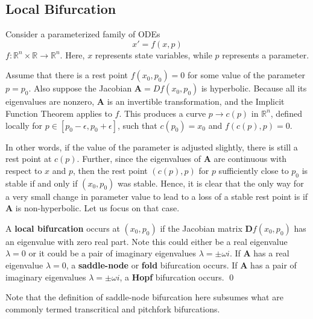 \subsection{Local Bifurcation}

Consider a parameterized family of ODEs
%
\begin{equation}
	x' = f(x, p)
\end{equation}
%
$f: \mathbb{R}^n \times \mathbb{R} \to \mathbb{R}^n$. Here, $x$ represents state variables, while $p$ represents a parameter. 

Assume that there is a rest point $f(x_0,p_0) = 0$ for some value of the parameter $p = p_0$. Also suppose the Jacobian $\mathbf{A} = Df(x_0, p_0)$ is hyperbolic.
%
%
Because all its eigenvalues are nonzero, $\mathbf{A}$ is an invertible transformation, and the Implicit Function Theorem applies to $f$. This produces a curve $p \to c(p)$ in $\mathbb{R}^n$, defined locally for $p \in [p_0-\epsilon, p_0 + \epsilon]$, such that $c(p_0) = x_0$ and $f(c(p), p) = 0$. 

In other words, if the value of the parameter is adjusted slightly, there is still a rest point at $c(p)$. Further, since the eigenvalues of $\textbf{A}$ are continuous with respect to $x$ and $p$, then the rest point $(c(p), p)$ for $p$ sufficiently close to $p_0$ is stable if and only if $(x_0,p_0)$ was stable. Hence, it is clear that the only way for a very small change in parameter value to lead to a loss of a stable rest point is if $\mathbf{A}$ is non-hyperbolic. Let us focus on that case.

\begin{definition}
	A \textbf{local bifurcation} occurs at ${\displaystyle (x_{0}, p_{0})}$ if the Jacobian matrix ${\displaystyle {\mathbf{D}f(x_{0},p _{0})}}$ has an eigenvalue with zero real part. Note this could either be a real eigenvalue $\lambda = 0$ or it could be a pair of imaginary eigenvalues $\lambda = \pm \omega i$. If $\textbf{A}$ has a real eigenvalue $\lambda = 0$, a \textbf{saddle-node} or \textbf{fold} bifurcation occurs. If $\textbf{A}$ has a pair of imaginary eigenvalues $\lambda = \pm \omega i$, a \textbf{Hopf} bifurcation occurs. \qed
\end{definition}

Note that the definition of saddle-node bifurcation here subsumes what are commonly termed transcritical and pitchfork bifurcations. 


